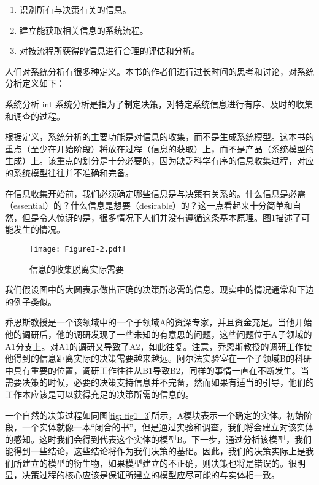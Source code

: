 \documentclass[cn,11pt,chinese]{elegantbook}
\begin{document}
\begin{enumerate}
	\item 识别所有与决策有关的信息。
	\item 建立能获取相关信息的系统流程。
	\item 对按流程所获得的信息进行合理的评估和分析。
\end{enumerate}

人们对系统分析有很多种定义。本书的作者们进行过长时间的思考和讨论，对系统分析定义如下：

\begin{definition}{系统分析} {int}
	系统分析是指为了制定决策，对特定系统信息进行有序、及时的收集和调查的过程。
\end{definition}

根据定义，系统分析的主要功能是对信息的收集，而不是生成系统模型。这本书的重点（至少在开始阶段）将放在过程（信息的获取）上，而不是产品（系统模型的生成）上。该重点的划分是十分必要的，因为缺乏科学有序的信息收集过程，对应的系统模型往往并不准确和完备。

在信息收集开始前，我们必须确定哪些信息是与决策有关系的。什么信息是必需（essential）的？什么信息是想要（desirable）的？这一点看起来十分简单和自然，但是令人惊讶的是，很多情况下人们并没有遵循这条基本原理。图\ref{fig: fig1_2}描述了可能发生的情况。

\begin{figure}[htpb]
	\centering
	\texttt{[image: FigureI-2.pdf]}
	\caption{信息的收集脱离实际需要}\label{fig: fig1_2}
\end{figure}


我们假设图中的大圆表示做出正确的决策所必需的信息。现实中的情况通常和下边的例子类似。

乔恩斯教授是一个该领域中的一个子领域A的资深专家，并且资金充足。当他开始他的调研后，他的调研发现了一些未知的有意思的问题，这些问题位于A子领域的A1分支上。对A1的调研又导致了A2，如此往复。注意，乔恩斯教授的调研工作使他得到的信息距离实际的决策需要越来越远。阿尔法实验室在一个子领域B的科研中具有重要的位置，调研工作往往从B1导致B2，同样的事情一直在不断发生。当需要决策的时候，必要的决策支持信息并不完备，然而如果有适当的引导，他们的工作本应该是可以获得充足的决策所需的信息的。


一个自然的决策过程如同图\ref{fig: fig1_3}所示，A模块表示一个确定的实体。初始阶段，一个实体就像一本“闭合的书”，但是通过实验和调查，我们将会建立对该实体的感知。这时我们会得到代表这个实体的模型B。下一步，通过分析该模型，我们能得到一些结论，这些结论将作为我们决策的基础。因此，我们的决策实际上是我们所建立的模型的衍生物，如果模型建立的不正确，则决策也将是错误的。很明显，决策过程的核心应该是保证所建立的模型应尽可能的与实体相一致。
\end{document}
